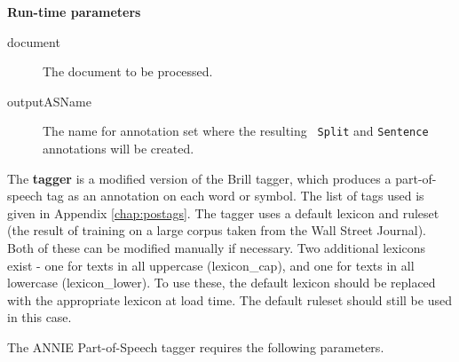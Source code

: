 {\bf Run-time parameters}
\begin{description}
\item[document] The document to be processed.
\item[outputASName] The name for annotation set where the resulting {\tt
Split} and {\tt Sentence} annotations will be created.
\end{description}

The \textbf{tagger} \cite{Hepple00} is a modified version of the Brill tagger,
which produces a part-of-speech tag as an annotation on each word or symbol.
The list of tags used is given in Appendix \ref{chap:postags}. The tagger uses
a default lexicon and ruleset (the result of training on a large corpus taken
from the Wall Street Journal). Both of these can be modified manually if
necessary. Two additional lexicons exist - one for texts in all uppercase
(lexicon\_cap), and one for texts in all lowercase (lexicon\_lower). To use
these, the default lexicon should be replaced with the appropriate lexicon at
load time. The default ruleset should still be used in this case. 

The ANNIE Part-of-Speech tagger requires the following parameters.
 
